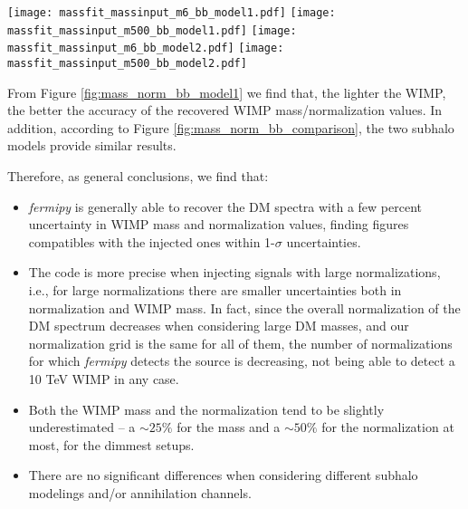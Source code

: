 \documentclass[%
 reprint,
nofootinbib,
 amsmath,amssymb,
 aps,
]{revtex4-2}
\begin{document}
\begin{figure*}[!ht]
\centering
\texttt{[image: massfit\_massinput\_m6\_bb\_model1.pdf]}
\texttt{[image: massfit\_massinput\_m500\_bb\_model1.pdf]}
\texttt{[image: massfit\_massinput\_m6\_bb\_model2.pdf]}
\texttt{[image: massfit\_massinput\_m500\_bb\_model2.pdf]}
\caption{Same as Figure \ref{fig:mass_norm_bb_model1}, but comparing the two subhalo models considered in our work. {Upper panels:} $10^4~\mathrm{M_\odot}$ subhalo. {Bottom panels:} $10^7~\mathrm{M_\odot}$ subhalo.}
\label{fig:mass_norm_bb_comparison}
\end{figure*}

From Figure \ref{fig:mass_norm_bb_model1} we find that, the lighter the WIMP, the better the accuracy of the recovered WIMP mass/normalization values. In addition, according to Figure \ref{fig:mass_norm_bb_comparison}, the two subhalo models provide similar results.

Therefore, as general conclusions, we find that:

\begin{itemize}
    \item \textit{fermipy} is generally able to recover the DM spectra with a few percent uncertainty in WIMP mass and normalization values, finding figures compatibles with the injected ones within 1-$\sigma$ uncertainties.
    
    \item The code is more precise when injecting signals with large normalizations, i.e., for large normalizations there are smaller uncertainties both in normalization and WIMP mass. In fact, since the overall normalization of the DM spectrum decreases when considering large DM masses, and our normalization grid is the same for all of them, the number of normalizations for which \textit{fermipy} detects the source is decreasing, not being able to detect a 10 TeV WIMP in any case.
    
    \item Both the WIMP mass and the normalization tend to be slightly underestimated -- a $\sim25\%$ for the mass and a $\sim50\%$ for the normalization at most, for the dimmest setups.
    
    \item There are no significant differences when considering different subhalo modelings and/or annihilation channels.
\end{itemize}
\end{document}
